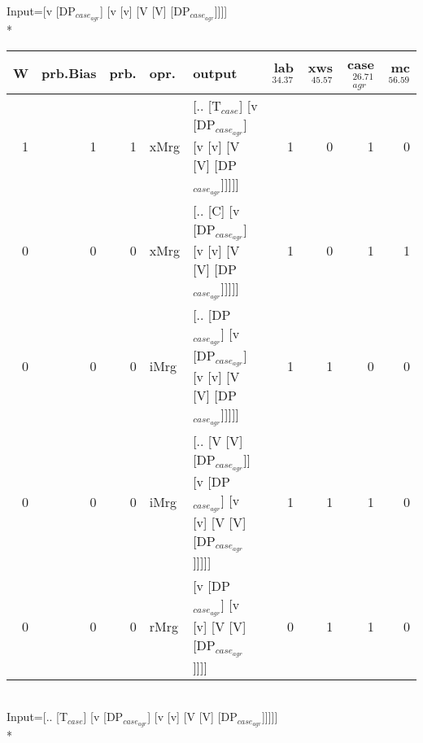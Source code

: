 \begingroup\scriptsize Input=[v [DP$_{case_{agr}}$] [v [v] [V [V] [DP$_{case_{agr}}$]]]]\\*
\begin{tabularx}{\linewidth}{rrrlXrrrr}
\hline
   W &   prb.Bias &   prb. & opr.   & output                                                                     &   lab$^{34.37}$ &   xws$^{45.57}$ &   case$_{agr}^{26.71}$ &   mc$^{56.59}$ \\
\hline
   1 &       1 &   1 & xMrg & [.. [T$_{case}$] [v [DP$_{case_{agr}}$] [v [v] [V [V] [DP$_{case_{agr}}$]]]]]              &             1 &             0 &                  1 &            0 \\
   0 &       0 &   0 & xMrg & [.. [C] [v [DP$_{case_{agr}}$] [v [v] [V [V] [DP$_{case_{agr}}$]]]]]                   &             1 &             0 &                  1 &            1 \\
   0 &       0 &   0 & iMrg & [.. [DP$_{case_{agr}}$] [v [DP$_{case_{agr}}$] [v [v] [V [V] [DP$_{case_{agr}}$]]]]]         &             1 &             1 &                  0 &            0 \\
   0 &       0 &   0 & iMrg & [.. [V [V] [DP$_{case_{agr}}$]] [v [DP$_{case_{agr}}$] [v [v] [V [V] [DP$_{case_{agr}}$]]]]] &             1 &             1 &                  1 &            0 \\
   0 &       0 &   0 & rMrg & [v [DP$_{case_{agr}}$] [v [v] [V [V] [DP$_{case_{agr}}$]]]]                            &             0 &             1 &                  1 &            0 \\
\hline
\end{tabularx}\endgroup\\
\begingroup\scriptsize Input=[.. [T$_{case}$] [v [DP$_{case_{agr}}$] [v [v] [V [V] [DP$_{case_{agr}}$]]]]]\\*
